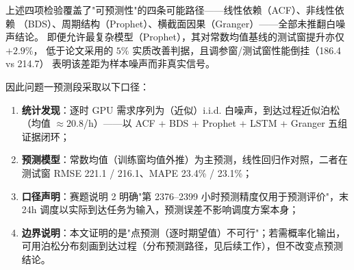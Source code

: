 \documentclass{internal-report}
\begin{document}
上述四项检验覆盖了"可预测性"的四条可能路径——线性依赖（ACF）、非线性依赖
（BDS）、周期结构（Prophet）、横截面因果（Granger）——全部未推翻白噪声结论。
即便允许最复杂模型（Prophet），其对常数均值基线的测试窗提升亦仅 $+2.9\%$，
低于论文采用的 $5\%$ 实质改善判据，且调参窗/测试窗性能倒挂（186.4 vs 214.7）
表明该差距为样本噪声而非真实信号。

因此问题一预测段采取以下口径：
\begin{enumerate}
  \item \textbf{统计发现}：逐时 GPU 需求序列为（近似）i.i.d. 白噪声，到达过程近似泊松（均值 $\approx 20.8$/h）——以 ACF + BDS + Prophet + LSTM + Granger 五组证据闭环；
  \item \textbf{预测模型}：常数均值（训练窗均值外推）为主预测，线性回归作对照，二者在测试窗 RMSE 221.1 / 216.1、MAPE 23.4\% / 23.1\%；
  \item \textbf{口径声明}：赛题说明 2 明确"第 2376--2399 小时预测精度仅用于预测评价"，末 24h 调度以实际到达任务为输入，预测误差不影响调度方案本身；
  \item \textbf{边界说明}：本文证明的是"点预测（逐时期望值）不可行"；若需概率化输出，可用泊松分布刻画到达过程（分布预测路径，见后续工作），但不改变点预测结论。
\end{enumerate}
\end{document}
